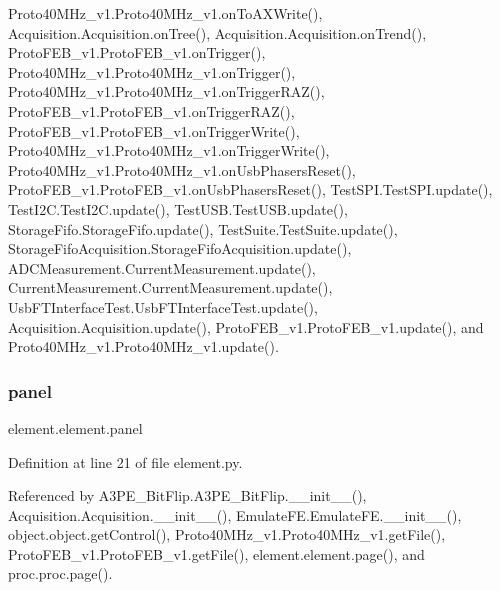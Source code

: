 Proto40\+M\+Hz\+\_\+v1.\+Proto40\+M\+Hz\+\_\+v1.\+on\+To\+A\+X\+Write(), Acquisition.\+Acquisition.\+on\+Tree(), Acquisition.\+Acquisition.\+on\+Trend(), Proto\+F\+E\+B\+\_\+v1.\+Proto\+F\+E\+B\+\_\+v1.\+on\+Trigger(), Proto40\+M\+Hz\+\_\+v1.\+Proto40\+M\+Hz\+\_\+v1.\+on\+Trigger(), Proto40\+M\+Hz\+\_\+v1.\+Proto40\+M\+Hz\+\_\+v1.\+on\+Trigger\+R\+A\+Z(), Proto\+F\+E\+B\+\_\+v1.\+Proto\+F\+E\+B\+\_\+v1.\+on\+Trigger\+R\+A\+Z(), Proto\+F\+E\+B\+\_\+v1.\+Proto\+F\+E\+B\+\_\+v1.\+on\+Trigger\+Write(), Proto40\+M\+Hz\+\_\+v1.\+Proto40\+M\+Hz\+\_\+v1.\+on\+Trigger\+Write(), Proto40\+M\+Hz\+\_\+v1.\+Proto40\+M\+Hz\+\_\+v1.\+on\+Usb\+Phasers\+Reset(), Proto\+F\+E\+B\+\_\+v1.\+Proto\+F\+E\+B\+\_\+v1.\+on\+Usb\+Phasers\+Reset(), Test\+S\+P\+I.\+Test\+S\+P\+I.\+update(), Test\+I2\+C.\+Test\+I2\+C.\+update(), Test\+U\+S\+B.\+Test\+U\+S\+B.\+update(), Storage\+Fifo.\+Storage\+Fifo.\+update(), Test\+Suite.\+Test\+Suite.\+update(), Storage\+Fifo\+Acquisition.\+Storage\+Fifo\+Acquisition.\+update(), A\+D\+C\+Measurement.\+Current\+Measurement.\+update(), Current\+Measurement.\+Current\+Measurement.\+update(), Usb\+F\+T\+Interface\+Test.\+Usb\+F\+T\+Interface\+Test.\+update(), Acquisition.\+Acquisition.\+update(), Proto\+F\+E\+B\+\_\+v1.\+Proto\+F\+E\+B\+\_\+v1.\+update(), and Proto40\+M\+Hz\+\_\+v1.\+Proto40\+M\+Hz\+\_\+v1.\+update().

\mbox{\label{classelement_1_1element_a0fce7cee12f437717c882d0965e46235}} 
\subsubsection{\texorpdfstring{panel}{panel}}
{\footnotesize\ttfamily element.\+element.\+panel\hspace{0.3cm}{\ttfamily [inherited]}}



Definition at line 21 of file element.\+py.



Referenced by A3\+P\+E\+\_\+\+Bit\+Flip.\+A3\+P\+E\+\_\+\+Bit\+Flip.\+\_\+\+\_\+init\+\_\+\+\_\+(), Acquisition.\+Acquisition.\+\_\+\+\_\+init\+\_\+\+\_\+(), Emulate\+F\+E.\+Emulate\+F\+E.\+\_\+\+\_\+init\+\_\+\+\_\+(), object.\+object.\+get\+Control(), Proto40\+M\+Hz\+\_\+v1.\+Proto40\+M\+Hz\+\_\+v1.\+get\+File(), Proto\+F\+E\+B\+\_\+v1.\+Proto\+F\+E\+B\+\_\+v1.\+get\+File(), element.\+element.\+page(), and proc.\+proc.\+page().

